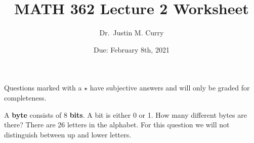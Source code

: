 \documentclass[addpoints,12pt]{exam}
\title{\vspace{-1in} MATH 362 Lecture 2 Worksheet}
\date{Due: February 8th, 2021}
\author{Dr.~Justin M. Curry}
\begin{document}
\maketitle


Questions marked with a $\star$ have subjective answers and will only be graded for completeness.
\begin{questions}
	\question[1] A \textbf{byte} consists of 8 \textbf{bits}. A bit is either 0 or 1. How many different bytes are there?
	\vspace{.5in}
	\question[3] There are 26 letters in the alphabet. For this question we will not distinguish between up and lower letters.
	\noaddpoints
\end{questions}
\end{document}

